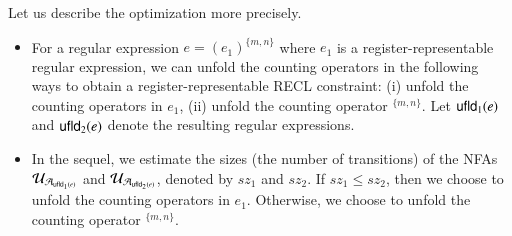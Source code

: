 Let us describe the optimization more precisely. 
\begin{itemize}
\item For a regular expression $e = (e_1)^{\{m,n\}}$ where $e_1$ is a register-representable regular expression, we can unfold the counting operators in the following ways to obtain a register-representable RECL constraint: (i) unfold the counting operators in $e_1$, (ii) unfold the counting operator $^{\{m,n\}}$. 
%
Let ${\sf ufld}_1(e)$ and ${\sf ufld}_2(e)$ denote the resulting regular expressions. 

\item In the sequel, we estimate the sizes (the number of transitions) of
the NFAs $\mathcal{U}_{\mathcal{A}_{{\sf ufld}_1(e)}}$ and $\mathcal{U}_{\mathcal{A}_{{\sf ufld}_2(e)}}$, denoted by $sz_1$ and $sz_2$. If $sz_1 \leq sz_2$, then we choose to unfold the counting operators in $e_1$. Otherwise, we choose to unfold the counting operator $^{\{m, n\}}$. 


\end{itemize}
